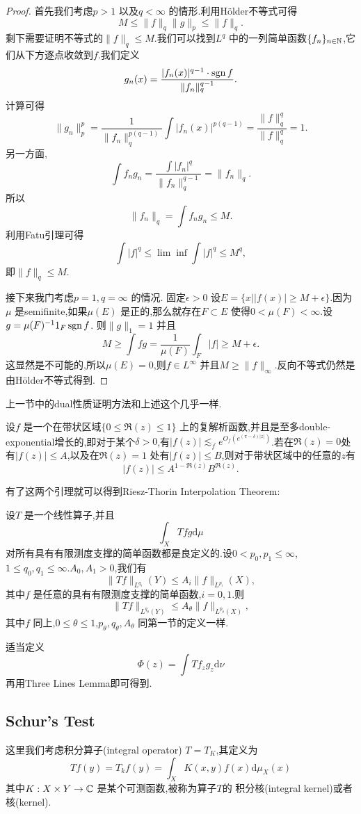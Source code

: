 \begin{proof}
  首先我们考虑$p>1$ 以及$q<\infty$ 的情形.利用H\"{o}lder不等式可得
   \[
  M\le \|f\|_q \|g\|_p\le \|f\|_q
  .\]
  剩下需要证明不等式的$\|f\|_q\le M$.我们可以找到$L^{q} $ 中的一列简单函数$\{f_n\}_{n\in \mathbb{N}} $,它们从下方逐点收敛到$f$.我们定义
   \[
     g_n(x)= \frac{|f_n(x)|^{q-1}\cdot \operatorname{sgn} f}{\|f_n\|_q^{q-1}}.
  \]
  计算可得
  \[
    \|g_n\|_p^{p}=\frac{1}{\|f_n\|_q^{p(q-1)}}\int |f_n(x)|^{p(q-1)}= \frac{\|f\|_q^{q}}{\|f\|_q^{q}}=1.
  \]
  另一方面,
  \[
  \int f_n g_n= \frac{\int |f_n|^{q}}{\|f_n\|_q^{q-1}}=\|f_n\|_q.
  \] 
  所以
  \[
  \|f_n\|_q=\int f_n g_n \le  M.
  \] 
  利用Fatu引理可得
  \[
  \int |f|^{q}\le \lim \inf \int |f|^{q}\le M^{q},
  \] 
  即$\|f\|_q\le M$.
  
  接下来我门考虑$p=1,q=\infty$ 的情况. 固定$\epsilon >0$ 设$E=\{x| |f(x)|\ge  M+\epsilon \} $.因为$\mu$ 是semifinite,如果$\mu(E)$ 是正的,那么就存在$F\subset E$ 使得$0<\mu(F)<\infty$.设$g=\mu(F)^{-1} 1_{F}\operatorname{sgn} f$. 则$\|g\|_1=1$ 并且
  \[
    M\ge \int fg=\frac{1}{\mu(F)}\int_F |f|\ge M+\epsilon .
  \] 
  这显然是不可能的,所以$\mu(E)=0$,则$f\in L^{\infty}$ 并且$M\ge \|f\|_{\infty}$.反向不等式仍然是由H\"{o}lder不等式得到.
\end{proof}
上一节中的dual性质证明方法和上述这个几乎一样.
\begin{lemma}
  设$f$ 是一个在带状区域$\{0\le\Re(z)\le 1 \} $ 上的复解析函数,并且是至多double-exponential增长的,即对于某个$\delta>0$,有$|f(z)|\lesssim_f e^{O_f\left( e^{(\pi-\delta)|z|} \right) }$.若在$\Re(z)=0$处有$|f(z)|\le A$,以及在$\Re(z)=1$ 处有$|f(z)|\le B$,则对于带状区域中的任意的$z$有
   \[
     |f(z)|\le A^{1-\Re(z)}B^{\Re(z)}.
  \] 
\end{lemma}
有了这两个引理就可以得到Riesz-Thorin Interpolation Theorem:
\begin{theorem}
设$T$ 是一个线性算子,并且
\[
\int_{X}Tfg \mathrm{d}\mu
\] 对所有具有有限测度支撑的简单函数都是良定义的.设$0<p_0,p_1\le \infty$,$1\le q_0,q_1\le \infty$.$A_0,A_1>0$,我们有
\[
  \|Tf\|_{L^{q_i}}(Y)\le A_i \|f\|_{L^{p_i}}(X),
\] 
其中$f$ 是任意的具有有限测度支撑的简单函数,$i=0,1$.则
 \[
   \|Tf\|_{L^{q_\theta}(Y)}\le A_\theta\|f\|_{L^{p_\theta}(X)},
\] 
其中$f$ 同上,$0\le \theta\le 1$,$p_\theta,q_\theta,A_\theta$ 同第一节的定义一样.
\end{theorem}
适当定义
\[
  \Phi(z)=\int Tf_z g_z \mathrm{d}\nu
\] 
再用Three Lines Lemma即可得到.
\subsection{Schur's Test}
这里我们考虑积分算子(integral operator) $T=T_K$,其定义为
\begin{equation}\label{2-20}
   Tf(y)=T_kf(y)=\int_{X}K(x,y)f(x)\mathrm{d}\mu_X(x)
 \end{equation} 
 其中$K:X\times Y\to \mathbb{C}$ 是某个可测函数,被称为算子$T$的 积分核(integral kernel)或者核(kernel).
 
